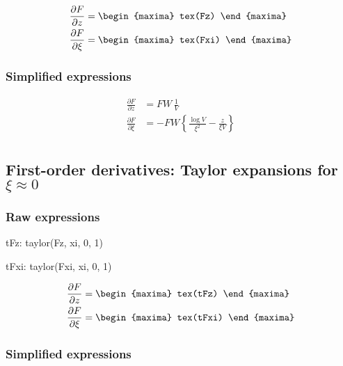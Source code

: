 {\color{MonVertF}
\begin{align*}
  \frac{\partial F}{\partial z}
  &=
    \begin{maxima}
       tex(Fz)
    \end{maxima} \\
  \frac{\partial F}{\partial \xi}
  &=
    \begin{maxima}
       tex(Fxi)
    \end{maxima} \\
\end{align*}
}
\subsubsection*{Simplified  expressions}
{\color{red}
\begin{align*}
  \frac{\partial F}{\partial z}
  &= F W \, \frac{1}{V} \\
  \frac{\partial F}{\partial \xi}
  &= - F W  \left\{ \frac{\log V}{\xi^2} - \frac{z}{\xi V} \right\}\\
\end{align*}
}



\subsection{First-order derivatives: Taylor expansions for $\xi \approx 0$}

\subsubsection*{Raw  expressions}

\begin{maxima}
  tFz: taylor(Fz, xi, 0, 1)
\end{maxima}%
\begin{maxima}
  tFxi: taylor(Fxi, xi, 0, 1)
\end{maxima}%
{\color{MonVertF}
\begin{align*}
  \frac{\partial F}{\partial z}
  &=
    \begin{maxima}
       tex(tFz)
    \end{maxima} \\
  \frac{\partial F}{\partial \xi}
  &=
    \begin{maxima}
       tex(tFxi)
    \end{maxima} \\
\end{align*}}

\subsubsection*{Simplified expressions}

